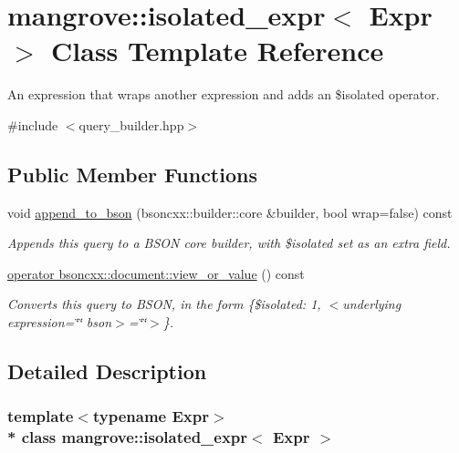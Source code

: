 \hypertarget{classmangrove_1_1isolated__expr}{}\section{mangrove\+:\+:isolated\+\_\+expr$<$ Expr $>$ Class Template Reference}
\label{classmangrove_1_1isolated__expr}


An expression that wraps another expression and adds an \$isolated operator.  




{\ttfamily \#include $<$query\+\_\+builder.\+hpp$>$}

\subsection*{Public Member Functions}
\begin{DoxyCompactItemize}
\item 
void \hyperlink{classmangrove_1_1isolated__expr_aa8f02e1ef7bf86bb9794e352110dbdc1}{append\+\_\+to\+\_\+bson} (bsoncxx\+::builder\+::core \&builder, bool wrap=false) const 
\begin{DoxyCompactList}\small\item\em Appends this query to a B\+S\+ON core builder, with \$isolated set as an extra field. \end{DoxyCompactList}\item 
\hyperlink{classmangrove_1_1isolated__expr_a4ce7fed3aa8510bce0de57c0cf65853f}{operator bsoncxx\+::document\+::view\+\_\+or\+\_\+value} () const \hypertarget{classmangrove_1_1isolated__expr_a4ce7fed3aa8510bce0de57c0cf65853f}{}\label{classmangrove_1_1isolated__expr_a4ce7fed3aa8510bce0de57c0cf65853f}

\begin{DoxyCompactList}\small\item\em Converts this query to B\+S\+ON, in the form \{\$isolated\+: 1, $<$underlying expression=\char`\"{}\char`\"{} bson$>$=\char`\"{}\char`\"{}$>$\}. \end{DoxyCompactList}\end{DoxyCompactItemize}


\subsection{Detailed Description}
\subsubsection*{template$<$typename Expr$>$\\*
class mangrove\+::isolated\+\_\+expr$<$ Expr $>$}

